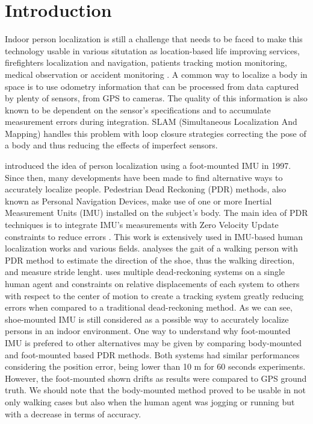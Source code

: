
\section{Introduction}\label{sec:intro}

Indoor person localization is still a challenge that needs to be faced to make this technology usable in various situtation as location-based life improving services, firefighters localization and navigation, patients tracking 
motion monitoring, medical observation or accident monitoring \cite{pourhomayoun2012spatial}.
A common way to localize a body in space is to use odometry information that can be processed from data captured by plenty of sensors, from GPS to cameras.
The quality of this information is also known to be dependent on the sensor's specifications and to accumulate measurement errors during integration. 
SLAM (Simultaneous Localization And Mapping) handles this problem with loop closure strategies correcting the pose of a body and thus reducing the effects of imperfect sensors.

\cite{hutchings1998system} introduced the idea of person localization using a foot-mounted IMU in 1997. Since then, many developments have been made to find alternative ways to accurately localize people.
Pedestrian Dead Reckoning (PDR) methods, also known as Personal Navigation Devices, make use of one or more Inertial Measurement Units (IMU) installed on the subject's body.
The main idea of PDR techniques is to integrate IMU's measurements with Zero Velocity Update constraints to reduce errors \cite{ojeda2007personal}.
This work is extensively used in IMU-based human localization works and various fields. \cite{kwanmuang2015phd} analyses the gait of a walking person 
with PDR method to estimate the direction of the shoe, thus the walking direction, and measure stride lenght. \cite{jin2011robust} uses multiple dead-reckoning systems on a single human 
agent and constraints on relative displacements of each system to others with respect to the center of motion to create a tracking system
greatly reducing errors when compared to a traditional dead-reckoning method. As we can see, shoe-mounted IMU is still considered as a possible way to
accurately localize persons in an indoor environment. One way to understand why foot-mounted IMU is prefered to other alternatives may be given by \cite{groves2007inertial} 
comparing body-mounted and foot-mounted based PDR methods. 
Both systems had similar performances considering the position error, being lower than 10 m for 60 seconds experiments. However, the foot-mounted shown drifts as results were compared
to GPS ground truth. We should note that the body-mounted method proved to be usable in not only walking cases but also when the human agent was jogging or running but with a decrease in terms of accuracy.

